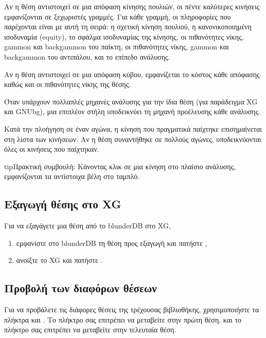\documentclass[letterpaper,10pt,greek]{sphinxmanual}
\begin{document}
\sphinxAtStartPar
Αν η θέση αντιστοιχεί σε μια απόφαση κίνησης πουλιών, οι πέντε καλύτερες κινήσεις εμφανίζονται σε ξεχωριστές γραμμές. Για κάθε γραμμή, οι πληροφορίες που παρέχονται είναι με αυτή τη σειρά: η σχετική κίνηση πουλιού, η κανονικοποιημένη ισοδυναμία (equity), το σφάλμα ισοδυναμίας της κίνησης, οι πιθανότητες νίκης, gammon και backgammon του παίκτη, οι πιθανότητες νίκης, gammon και backgammon του αντιπάλου, και το επίπεδο ανάλυσης.

\sphinxAtStartPar
Αν η θέση αντιστοιχεί σε μια απόφαση κύβου, εμφανίζεται το κόστος κάθε απόφασης καθώς και οι πιθανότητες νίκης της θέσης.

\sphinxAtStartPar
Όταν υπάρχουν πολλαπλές μηχανές ανάλυσης για την ίδια θέση (για παράδειγμα XG και GNUbg), μια επιπλέον στήλη υποδεικνύει τη μηχανή προέλευσης κάθε ανάλυσης.

\sphinxAtStartPar
Κατά την πλοήγηση σε έναν αγώνα, η κίνηση που πραγματικά παίχτηκε επισημαίνεται στη λίστα των κινήσεων. Αν η θέση συναντήθηκε σε πολλούς αγώνες, υποδεικνύονται όλες οι κινήσεις που παίχτηκαν.

\begin{sphinxadmonition}{tip}{Πρακτική συμβουλή:}
\sphinxAtStartPar
Κάνοντας κλικ σε μια κίνηση στο πλαίσιο ανάλυσης, εμφανίζονται τα αντίστοιχα βέλη στο ταμπλό.
\end{sphinxadmonition}


\subsection{Εξαγωγή θέσης στο XG}
\label{\detokenize{guide_utilisateur:exporter-une-position-vers-xg}}
\sphinxAtStartPar
Για να εξαγάγετε μια θέση από το blunderDB στο XG,
\begin{enumerate}
%
\item {} 
\sphinxAtStartPar
εμφανίστε στο blunderDB τη θέση προς εξαγωγή και πατήστε ,

\item {} 
\sphinxAtStartPar
ανοίξτε το XG και πατήστε .

\end{enumerate}


\subsection{Προβολή των διαφόρων θέσεων}
\label{\detokenize{guide_utilisateur:visualiser-les-differentes-positions}}
\sphinxAtStartPar
Για να προβάλετε τις διάφορες θέσεις της τρέχουσας βιβλιοθήκης, χρησιμοποιήστε τα πλήκτρα  και . Το πλήκτρο  σας επιτρέπει να μεταβείτε στην πρώτη θέση, και το πλήκτρο  σας επιτρέπει να μεταβείτε στην τελευταία θέση.
\end{document}
